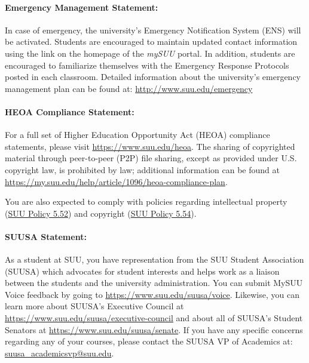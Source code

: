 \documentclass[12pt, letterpaper]{article}
\begin{document}
\paragraph{Emergency Management Statement:}
In case of emergency, the university's Emergency Notification System (ENS) will be activated. Students are encouraged to maintain updated contact information using the link on the homepage of the \emph{mySUU} portal. In addition, students are encouraged to familiarize themselves with the Emergency Response Protocols posted in each classroom. Detailed information about the university's emergency management plan can be found at: \href{http://www.suu.edu/emergency}{http://www.suu.edu/emergency}

\paragraph{HEOA Compliance Statement:}
For a full set of Higher Education Opportunity Act (HEOA) compliance statements, please visit \href{https://www.suu.edu/heoa}{https://www.suu.edu/heoa}. The sharing of copyrighted material through peer-to-peer (P2P) file sharing, except as provided under U.S. copyright law, is prohibited by law; additional information can be found at \newline\href{https://my.suu.edu/help/article/1096/heoa-compliance-plan}{https://my.suu.edu/help/article/1096/heoa-compliance-plan}.

\noindent
You are also expected to comply with policies regarding intellectual property (\href{https://www.suu.edu/policies/05/52.html}{SUU Policy 5.52}) and copyright (\href{https://www.suu.edu/policies/05/54.html}{SUU Policy 5.54}).

\paragraph{SUUSA Statement:}
As a student at SUU, you have representation from the SUU Student Association (SUUSA) which advocates for student interests and helps work as a liaison between the students and the university administration. You can submit MySUU Voice feedback by going to \href{https://www.suu.edu/suusa/voice}{https://www.suu.edu/suusa/voice}. Likewise, you can learn more about SUUSA’s Executive Council at \href{https://www.suu.edu/suusa/executive-council}{https://www.suu.edu/suusa/executive-council} and about all of SUUSA’s Student Senators at \href{https://www.suu.edu/suusa/senate}{https://www.suu.edu/suusa/senate}. If you have any specific concerns regarding any of your courses, please contact the SUUSA VP of Academics at: \href{suusa_academicsvp@suu.edu}{suusa\_\ignorespaces academicsvp@suu.edu}.
\end{document}
